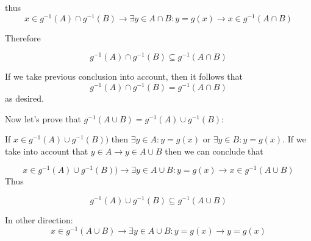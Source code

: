 \documentclass[11pt,oneside,titlepage]{article}
\begin{document}
thus
$$x \in g^{-1}(A) \cap g^{-1}(B) \to \exists y \in A \cap B: y = g(x) \to
x \in g^{-1}(A \cap B)$$

Therefore 

$$ g^{-1}(A) \cap g^{-1}(B) \subseteq   g^{-1}(A \cap B)$$

If we take previous conclusion into account, then it follows that
$$ g^{-1}(A) \cap g^{-1}(B) = g^{-1}(A \cap B)$$
as desired.

Now let's prove that  $g^{-1}(A \cup B) = g^{-1}(A) \cup g^{-1}(B)$:


If $ x \in g^{-1}(A) \cup g^{-1}(B))$ then  $\exists y \in A: y = g(x)$ or
$\exists y \in B: y = g(x)$. If we take into account that $y \in A \to y \in A \cup B$ then we can conclude that

$$ x \in g^{-1}(A) \cup g^{-1}(B)) \to \exists y \in A \cup B : y = g(x) \to
x \in g^{-1}(A \cup B)$$
Thus

$$g^{-1}(A) \cup g^{-1}(B) \subseteq g^{-1}(A \cup B)$$

In other direction: 
$$x \in g^{-1}(A \cup B) \to \exists y \in A \cup B: y = g(x) \to y = g(x)$$
\end{document}
